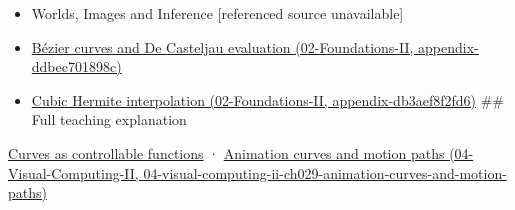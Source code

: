 \begin{itemize}
\item
  {Worlds, Images and Inference {[}referenced source unavailable{]}}
\item
  \href{../02-Foundations-II/main.pdf\#nameddest=appendix-ddbec701898c}{Bézier curves and De Casteljau evaluation (02-Foundations-II, appendix-ddbec701898c)}
\item
  \href{../02-Foundations-II/main.pdf\#nameddest=appendix-db3aef8f2fd6}{Cubic Hermite interpolation (02-Foundations-II, appendix-db3aef8f2fd6)} \#\# Full teaching explanation
\end{itemize}

\hyperref[03-visual-computing-i-ch001-curves-as-controllable-functions]{Curves as controllable functions} · \href{../04-Visual-Computing-II/main.pdf\#nameddest=04-visual-computing-ii-ch029-animation-curves-and-motion-paths}{Animation curves and motion paths (04-Visual-Computing-II, 04-visual-computing-ii-ch029-animation-curves-and-motion-paths)}
